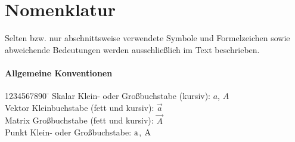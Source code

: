 \chapter*{Nomenklatur}
Selten bzw. nur abschnittsweise verwendete Symbole und Formelzeichen sowie abweichende Bedeutungen werden ausschließlich im Text beschrieben.
\subsubsection{Allgemeine Konventionen}\vspace{-3mm}
\begin{tabbing}
	1234567890 \= \kill
	Skalar \> Klein- oder Großbuchstabe (kursiv): $a$, $A$    \\
	Vektor \> Kleinbuchstabe (fett und kursiv): $\vec{a}$     \\
	Matrix \> Großbuchstabe (fett und kursiv): $\vec{A}$      \\
	Punkt  \> Klein- oder Großbuchstabe: ${\mathrm{a}}$, ${\mathrm{A}}$ \\            
\end{tabbing}
